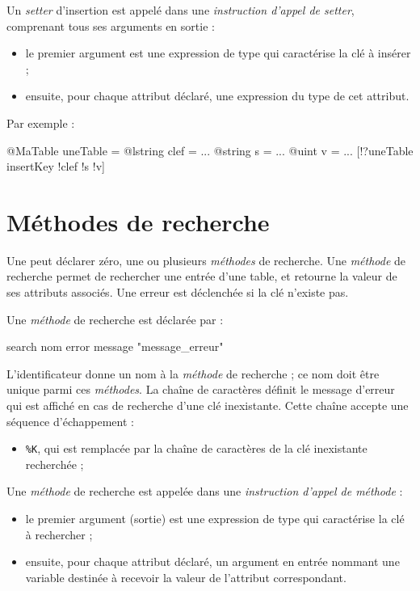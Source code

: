 Un \emph{setter} d'insertion est appelé dans une \emph{instruction d'appel de setter}, comprenant tous ses arguments en sortie :
\begin{itemize}
  \item le premier argument est une expression de type  qui caractérise la clé à insérer ;
  \item ensuite, pour chaque attribut déclaré, une expression du type de cet attribut.
\end{itemize}

Par exemple :
\begin{galgascode}
@MaTable uneTable = {}
@lstring clef = ...
@string s = ...
@uint v = ...
[!?uneTable insertKey !clef !s !v]
\end{galgascode}











\section{Méthodes de recherche}

Une  peut déclarer zéro, une ou plusieurs \emph{méthodes} de recherche. Une \emph{méthode} de recherche permet de rechercher une entrée d'une table, et retourne la valeur de ses attributs associés. Une erreur est déclenchée si la clé n'existe pas.


Une \emph{méthode} de recherche est déclarée par :


\begin{galgascode}
search nom error message "message_erreur"
\end{galgascode}

L'identificateur  donne un nom à la \emph{méthode} de recherche ; ce nom doit être unique parmi ces \emph{méthodes}. La chaîne de caractères  définit le message d'erreur qui est affiché en cas de recherche d'une clé inexistante. Cette chaîne accepte une séquence d'échappement :
\begin{itemize}
  \item \colorbox{\couleurCodeGALGAS}{\texttt{\%K}}, qui est remplacée par la chaîne de caractères de la clé inexistante recherchée ;
\end{itemize}


Une \emph{méthode} de recherche est appelée dans une \emph{instruction d'appel de méthode} :
\begin{itemize}
  \item le premier argument (sortie) est une expression de type  qui caractérise la clé à rechercher ;
  \item ensuite, pour chaque attribut déclaré, un argument en entrée nommant une variable destinée à recevoir la valeur de l'attribut correspondant.
\end{itemize}

